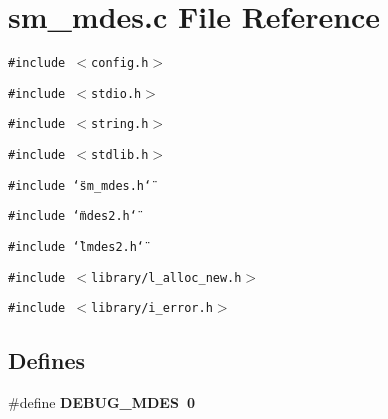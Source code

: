 \section{sm\_\-mdes.c File Reference}
\label{sm__mdes_8c}
{\tt \#include $<$config.h$>$}\par
{\tt \#include $<$stdio.h$>$}\par
{\tt \#include $<$string.h$>$}\par
{\tt \#include $<$stdlib.h$>$}\par
{\tt \#include \char`\"{}sm\_\-mdes.h\char`\"{}}\par
{\tt \#include \char`\"{}mdes2.h\char`\"{}}\par
{\tt \#include \char`\"{}lmdes2.h\char`\"{}}\par
{\tt \#include $<$library/l\_\-alloc\_\-new.h$>$}\par
{\tt \#include $<$library/i\_\-error.h$>$}\par
\subsection*{Defines}
\begin{CompactItemize}
\item 
\#define \bf{DEBUG\_\-MDES}~0
\end{CompactItemize}
